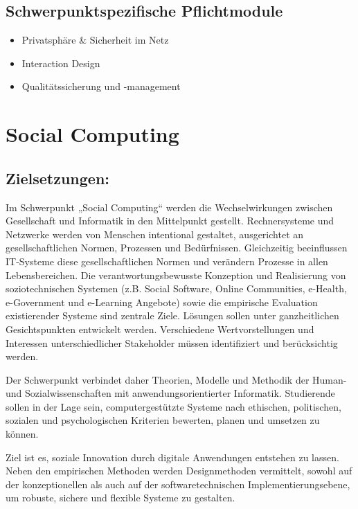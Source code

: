 \section*{Schwerpunktspezifische
Pflichtmodule}\label{schwerpunktspezifische-pflichtmodule-1}

\begin{itemize}
\tightlist
\item
  Privatsphäre \& Sicherheit im Netz
\item
  Interaction Design
\item
  Qualitätssicherung und -management
\end{itemize}

\chapter{Social Computing}\label{social-computing}

\section*{Zielsetzungen:}\label{zielsetzungen-1}

Im Schwerpunkt „Social Computing`` werden die Wechselwirkungen zwischen
Gesellschaft und Informatik in den Mittelpunkt gestellt. Rechnersysteme
und Netzwerke werden von Menschen intentional gestaltet, ausgerichtet an
gesellschaftlichen Normen, Prozessen und Bedürfnissen. Gleichzeitig
beeinflussen IT-Systeme diese gesellschaftlichen Normen und verändern
Prozesse in allen Lebensbereichen. Die verantwortungsbewusste Konzeption
und Realisierung von soziotechnischen Systemen (z.B. Social Software,
Online Communities, e-Health, e-Government und e-Learning Angebote)
sowie die empirische Evaluation existierender Systeme sind zentrale
Ziele. Lösungen sollen unter ganzheitlichen Gesichtspunkten entwickelt
werden. Verschiedene Wertvorstellungen und Interessen unterschiedlicher
Stakeholder müssen identifiziert und berücksichtig werden.

Der Schwerpunkt verbindet daher Theorien, Modelle und Methodik der
Human- und Sozialwissenschaften mit anwendungsorientierter Informatik.
Studierende sollen in der Lage sein, computergestützte Systeme nach
ethischen, politischen, sozialen und psychologischen Kriterien bewerten,
planen und umsetzen zu können.

Ziel ist es, soziale Innovation durch digitale Anwendungen entstehen zu
lassen. Neben den empirischen Methoden werden Designmethoden vermittelt,
sowohl auf der konzeptionellen als auch auf der softwaretechnischen
Implementierungsebene, um robuste, sichere und flexible Systeme zu
gestalten.


